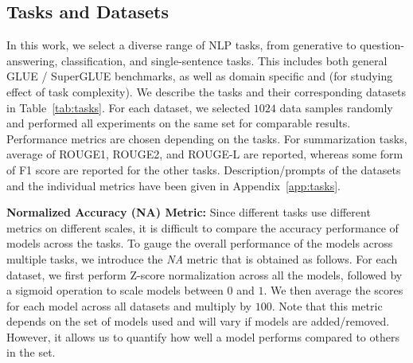 \subsection{Tasks and Datasets} 
In this work, we select a diverse range of NLP tasks, from generative to question-answering, classification, and single-sentence tasks. This includes both general GLUE / SuperGLUE benchmarks, as well as domain specific \vax and \caves (for studying effect of task complexity).
We describe the tasks and their corresponding datasets in Table~\ref{tab:tasks}. 
%
%
%
%
%
%
For each dataset, we selected $1024$ data samples randomly and performed all experiments on the same set for comparable results.
Performance metrics are chosen depending on the tasks. For summarization tasks, average of ROUGE1, ROUGE2, and ROUGE-L are reported, whereas some form of F1 score are reported for the other tasks. Description/prompts of the datasets and the individual metrics have been given in Appendix~\ref{app:tasks}.



\vspace{1mm}
\noindent \textbf{Normalized Accuracy (NA) Metric:}
Since different tasks use different metrics on different scales, it is difficult to compare the accuracy performance of models across the tasks. To gauge the overall performance of the models across multiple tasks, we introduce the \textit{NA} metric that is obtained as follows. For each dataset, we first perform Z-score normalization across all the models, followed by a sigmoid operation to scale models between $0$ and $1$. We then average the scores for each model across all datasets and multiply by $100$.
Note that this metric depends on the set of models used and will vary if models are added/removed. However, it allows us to quantify how well a model performs compared to others in the set.





